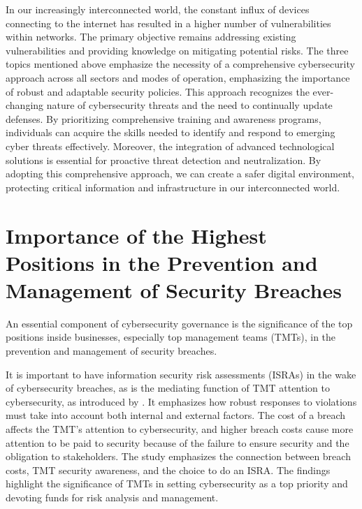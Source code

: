 \documentclass[journal]{IEEEtran}
\begin{document}
In our increasingly interconnected world, the constant influx of devices connecting to the internet has resulted in a higher number of vulnerabilities within networks. The primary objective remains addressing existing vulnerabilities and providing knowledge on mitigating potential risks. The three topics mentioned above emphasize the necessity of a comprehensive cybersecurity approach across all sectors and modes of operation, emphasizing the importance of robust and adaptable security policies. This approach recognizes the ever-changing nature of cybersecurity threats and the need to continually update defenses. By prioritizing comprehensive training and awareness programs, individuals can acquire the skills needed to identify and respond to emerging cyber threats effectively. Moreover, the integration of advanced technological solutions is essential for proactive threat detection and neutralization. By adopting this comprehensive approach, we can create a safer digital environment, protecting critical information and infrastructure in our interconnected world.



\section{Importance of the Highest Positions in the Prevention and Management of Security Breaches}

An essential component of cybersecurity governance is the significance of the top positions inside businesses, especially top management teams (TMTs), in the prevention and management of security breaches. 

It is important to have information security risk assessments (ISRAs) in the wake of cybersecurity breaches, as is the mediating function of TMT attention to cybersecurity, as introduced by \cite{article3} . It emphasizes how robust responses to violations must take into account both internal and external factors. The cost of a breach affects the TMT's attention to cybersecurity, and higher breach costs cause more attention to be paid to security because of the failure to ensure security and the obligation to stakeholders. The study emphasizes the connection between breach costs, TMT security awareness, and the choice to do an ISRA. The findings highlight the significance of TMTs in setting cybersecurity as a top priority and devoting funds for risk analysis and management.
\end{document}
